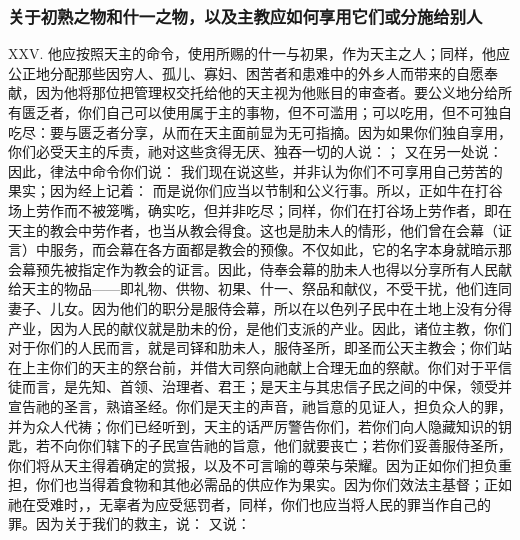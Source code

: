 
\subsubsection{关于初熟之物和什一之物，以及主教应如何享用它们或分施给别人}

XXV. 他应按照天主的命令，使用所赐的什一与初果，作为天主之人；同样，他应公正地分配那些因穷人、孤儿、寡妇、困苦者和患难中的外乡人而带来的自愿奉献，因为他将那位把管理权交托给他的天主视为他账目的审查者。要公义地分给所有匮乏者，你们自己可以使用属于主的事物，但不可滥用；可以吃用，但不可独自吃尽：要与匮乏者分享，从而在天主面前显为无可指摘。因为如果你们独自享用，你们必受天主的斥责，祂对这些贪得无厌、独吞一切的人说：； 又在另一处说：  因此，律法中命令你们说：  我们现在说这些，并非认为你们不可享用自己劳苦的果实；因为经上记着：  而是说你们应当以节制和公义行事。所以，正如牛在打谷场上劳作而不被笼嘴，确实吃，但并非吃尽；同样，你们在打谷场上劳作者，即在天主的教会中劳作者，也当从教会得食。这也是肋未人的情形，他们曾在会幕（证言）中服务，而会幕在各方面都是教会的预像。不仅如此，它的名字本身就暗示那会幕预先被指定作为教会的证言。因此，侍奉会幕的肋未人也得以分享所有人民献给天主的物品——即礼物、供物、初果、什一、祭品和献仪，不受干扰，他们连同妻子、儿女。因为他们的职分是服侍会幕，所以在以色列子民中在土地上没有分得产业，因为人民的献仪就是肋未的份，是他们支派的产业。因此，诸位主教，你们对于你们的人民而言，就是司铎和肋未人，服侍圣所，即圣而公天主教会；你们站在上主你们的天主的祭台前，并借大司祭向祂献上合理无血的祭献。你们对于平信徒而言，是先知、首领、治理者、君王；是天主与其忠信子民之间的中保，领受并宣告祂的圣言，熟谙圣经。你们是天主的声音，祂旨意的见证人，担负众人的罪，并为众人代祷；你们已经听到，天主的话严厉警告你们，若你们向人隐藏知识的钥匙，若不向你们辖下的子民宣告祂的旨意，他们就要丧亡；若你们妥善服侍圣所，你们将从天主得着确定的赏报，以及不可言喻的尊荣与荣耀。因为正如你们担负重担，你们也当得着食物和其他必需品的供应作为果实。因为你们效法主基督；正如祂在受难时，，无辜者为应受惩罚者，同样，你们也应当将人民的罪当作自己的罪。因为关于我们的救主，说：  又说：  